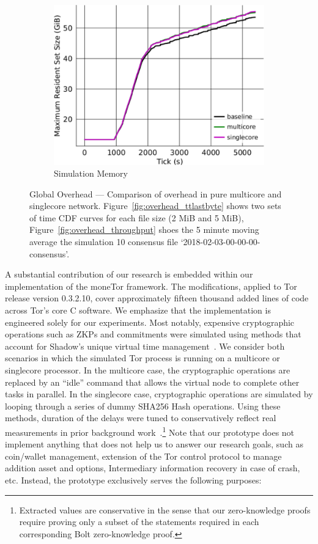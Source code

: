 \begin{figure}[t]
\begin{subfigure}[t]{0.32\textwidth}
    \includegraphics[clip, width=1.0\textwidth]{images/overhead_memory.pdf}
    \caption{Simulation Memory}
    \label{fig:overhead_shadow}
  \end{subfigure}
  \caption{Global Overhead --- Comparison of overhead in pure multicore and singlecore network.
    Figure~\ref{fig:overhead_ttlastbyte} shows two sets of time CDF curves for each file size (2 MiB and 5 MiB), Figure~\ref{fig:overhead_throughput} shoes the 5 minute moving average the simulation 10 consensus file `2018-02-03-00-00-00-consensus'.}
  \label{fig:overhead}
\end{figure}

A substantial contribution of our research is embedded within our implementation of the moneTor framework.
The modifications, applied to Tor release version 0.3.2.10, cover approximately fifteen thousand added lines of code across Tor's core C software.
We emphasize that the implementation is engineered solely for our experiments.
Most notably, expensive cryptographic operations such as ZKPs and commitments were simulated using methods that account for Shadow's unique virtual time management~\cite{jansen2011shadow}.
We consider both scenarios in which the simulated Tor process is running on a multicore or singlecore processor.
In the multicore case, the cryptographic operations are replaced by an ``idle'' command that allows the virtual node to complete other tasks in parallel.
In the singlecore case, cryptographic operations are simulated by looping through a series of dummy SHA256 Hash operations.
Using these methods, duration of the delays were tuned to conservatively reflect real measurements in prior background work~\cite{green2017bolt}.\footnote{Extracted values are conservative in the sense that our zero-knowledge proofs require proving only a subset of the statements required in each corresponding Bolt zero-knowledge proof.}
Note that our prototype does not implement anything that does not help us to answer our research goals, such as coin/wallet management, extension of the Tor control protocol to manage addition asset and options, Intermediary information recovery in case of crash, etc.
Instead, the prototype exclusively serves the following purposes:

